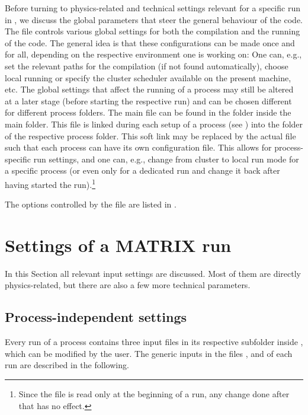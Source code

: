 \documentclass[english,11pt]{article}
\begin{document}
Before turning to physics-related and technical settings relevant for a specific \Matrix{} run in , we discuss the global 
parameters that steer the general behaviour of the code.
The file  controls various global settings for both the compilation and the running of the code. 
The general idea is that these configurations can be made once and for all, depending on the respective environment 
one is working on: One can, e.g., set the relevant paths for the compilation (if not found automatically), choose 
local running or specify the cluster scheduler available on the present machine, etc. The global settings that affect the running of a process 
may still be altered at a later stage (before starting the respective run) and 
can be chosen different for different process folders. The main file  can be found in the folder  
inside the \Matrix{} main folder. This file is linked during each setup of a process (see ) into the folder
 of the respective process folder. This soft link may be replaced by the actual file such that each process 
can have its own configuration file. This allows for process-specific run settings, and
one can, e.g., change from cluster 
to local run mode for a specific process (or even only for a dedicated run and change it back after having started the run).\footnote{Since the file
 is read only at the beginning of a run, any change done after that has no effect.}

The options controlled by the file  are listed in .




\section[Settings of a M{\scriptsize ATRIX} run]{Settings of a M{\small ATRIX} run}\label{sec:inputfiles}

In this Section all relevant input settings are discussed. Most of them are directly physics-related, but there are also a few more technical parameters. 

\subsection{Process-independent settings}

Every run of a process contains three input files in its respective subfolder inside , which can be modified by the user. The generic inputs in the files
,  and  of each \Matrix{} run are described in the following.
\end{document}
